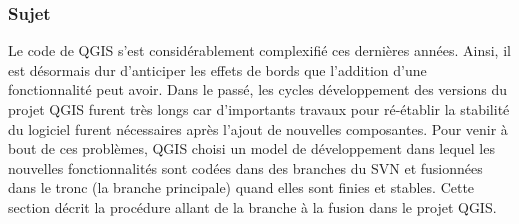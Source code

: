 \subsubsection{Sujet}

Le code de QGIS s'est considérablement complexifié ces dernières années. Ainsi, il est désormais dur d'anticiper les effets de bords que l'addition d'une fonctionnalité peut avoir. Dans le passé, les cycles développement des versions du projet QGIS furent très longs car d'importants travaux pour ré-établir la stabilité du logiciel furent nécessaires après l'ajout de nouvelles composantes. Pour venir à bout de ces problèmes, QGIS choisi un model de développement dans lequel les nouvelles fonctionnalités sont codées dans des branches du SVN et fusionnées dans le tronc (la branche principale) quand elles sont finies et stables. Cette section décrit la procédure allant de la branche à la fusion dans le projet QGIS. 

